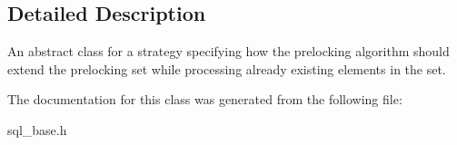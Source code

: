 \subsection{Detailed Description}
An abstract class for a strategy specifying how the prelocking algorithm should extend the prelocking set while processing already existing elements in the set. 

The documentation for this class was generated from the following file\+:\begin{DoxyCompactItemize}
\item 
sql\+\_\+base.\+h\end{DoxyCompactItemize}
